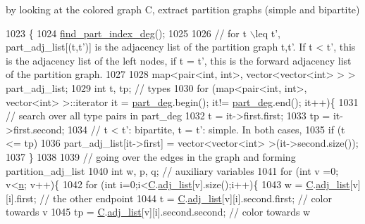 by looking at the colored graph C, extract partition graphs (simple and bipartite) 


\begin{DoxyCode}
1023 \{
1024   \hyperlink{classmarked__graph__encoder_a1cb2cd754108302a0437a924dc70bc0e}{find\_part\_index\_deg}();
1025 
1026   \textcolor{comment}{// for t \(\backslash\)leq t', part\_adj\_list[(t,t')] is the adjacency list of the partition graph t,t'. If t < t',
       this is the adjacency list of the left nodes, if t = t', this is the forward adjacency list of the partition
       graph.}
1027 
1028   map<pair<int, int>, vector<vector<int> > > part\_adj\_list;
1029   \textcolor{keywordtype}{int} t, tp; \textcolor{comment}{// types }
1030   \textcolor{keywordflow}{for} (map<pair<int, int>, vector<int> >::iterator it = \hyperlink{classmarked__graph__encoder_a55ea2edb2609dfc287432f61900d6ad1}{part\_deg}.begin(); it!= 
      \hyperlink{classmarked__graph__encoder_a55ea2edb2609dfc287432f61900d6ad1}{part\_deg}.end(); it++)\{
1031     \textcolor{comment}{// search over all type pairs in part\_deg}
1032     t = it->first.first;
1033     tp = it->first.second;
1034     \textcolor{comment}{// t < t': bipartite, t = t': simple. In both cases, }
1035     \textcolor{keywordflow}{if} (t <= tp)
1036       part\_adj\_list[it->first] = vector<vector<int> >(it->second.size());
1037   \}
1038 
1039   \textcolor{comment}{// going over the edges in the graph and forming partition\_adj\_list}
1040   \textcolor{keywordtype}{int} w, p, q; \textcolor{comment}{// auxiliary variables }
1041   \textcolor{keywordflow}{for} (\textcolor{keywordtype}{int} v =0; v<\hyperlink{classmarked__graph__encoder_a4c66d9fdbc14c97523715aac7e4511cb}{n}; v++)\{
1042     \textcolor{keywordflow}{for} (\textcolor{keywordtype}{int} i=0;i<\hyperlink{classmarked__graph__encoder_af82bc0653414091291cb75553a407bdb}{C}.\hyperlink{classcolored__graph_a45dce16965079286cf3f41a54a1b2ea4}{adj\_list}[v].size();i++)\{
1043       w = \hyperlink{classmarked__graph__encoder_af82bc0653414091291cb75553a407bdb}{C}.\hyperlink{classcolored__graph_a45dce16965079286cf3f41a54a1b2ea4}{adj\_list}[v][i].first; \textcolor{comment}{// the other endpoint}
1044       t = \hyperlink{classmarked__graph__encoder_af82bc0653414091291cb75553a407bdb}{C}.\hyperlink{classcolored__graph_a45dce16965079286cf3f41a54a1b2ea4}{adj\_list}[v][i].second.first; \textcolor{comment}{// color towards v}
1045       tp = \hyperlink{classmarked__graph__encoder_af82bc0653414091291cb75553a407bdb}{C}.\hyperlink{classcolored__graph_a45dce16965079286cf3f41a54a1b2ea4}{adj\_list}[v][i].second.second; \textcolor{comment}{// color towards w}

\end{DoxyCode}
